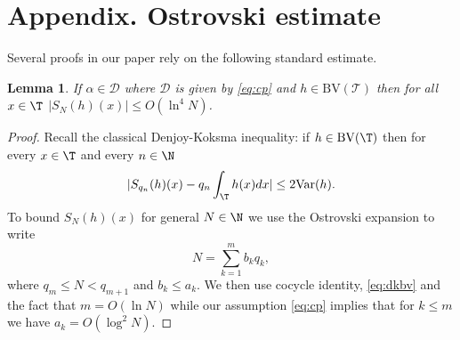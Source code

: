 \documentclass[JEP,XML,SOM,Unicode,NoFloatCountersInSection]{cedram}
\newcommand\BV{\mathrm{BV}}
\newcommand\cD{\mathcal{D}}
\newcommand\cT{\mathcal{T}}
\theoremstyle{definition}
\theoremstyle{plain}
\newtheorem{lemma}[definition]{Lemma}
\begin{document}
\appendix
\section*{Appendix. Ostrovski estimate}

Several proofs in our paper rely on the following standard estimate.

\begin{lemma}
\label{LmSumBV}
If $\alpha\in \cD$ where $\cD$ is given by \eqref{eq:cp} and $h\in \BV(\cT)$ then for all $x\in \T$
$|S_N(h)(x)|\leq O(\ln^4 N)$.
\end{lemma}

\begin{proof}
Recall
the classical Denjoy-Koksma inequality:
if $h\in \BV(\T)$ then
for every $x\in \T$ and every $n\in \N$
\begin{equation}\label{eq:dkbv}
|S_{q_n}(h)(x)-q_n\int_\T h(x) d x|\leq 2{\rm Var}(h).
\end{equation}
To bound $S_N(h)(x)$ for general $N\in\N$ we use the Ostrovski expansion to write
\[
N=\sum_{k=1}^m b_kq_k,
\]
where $q_m\leq N<q_{m+1}$
and $b_k\leq a_k$. We then use cocycle identity, \eqref{eq:dkbv} and the fact that $m=O(\ln N)$ while
our assumption \eqref{eq:cp} implies that for $k\leq m$ we have $a_k=O(\log^2 N)$.
\end{proof}




\end{document}
